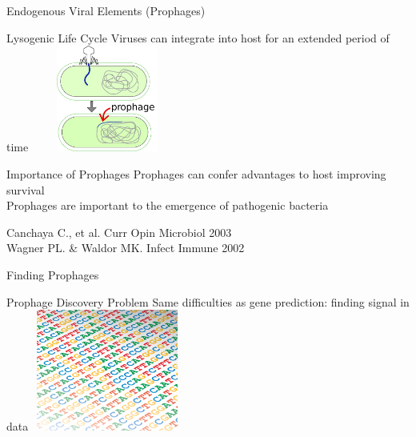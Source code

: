 \documentclass[11pt]{beamer}
\begin{document}
	\begin{frame}{Endogenous Viral Elements (Prophages)}
	\begin{block}{Lysogenic Life Cycle}
	Viruses can integrate into host for an extended period of time
	\center
	\vspace{-0.2cm}
	\includegraphics[height=3.5cm, width=5cm]{prophage.png}
	\end{block}
	\begin{block}{Importance of Prophages}
	Prophages can confer advantages to host improving survival \\ 
	Prophages are important to the emergence of pathogenic bacteria
	\end{block}
	
	\tiny{Canchaya C., et al. Curr Opin Microbiol 2003 \\ Wagner PL. \& Waldor MK. Infect Immune 2002}
	\end{frame}

	\begin{frame}{Finding Prophages}
	\begin{block}{Prophage Discovery Problem}
	Same difficulties as gene prediction: finding signal in data
	\center
	\includegraphics[height=4cm, width=5cm]{dna.png}
	\end{block}
	\end{frame}
	
\end{document}

